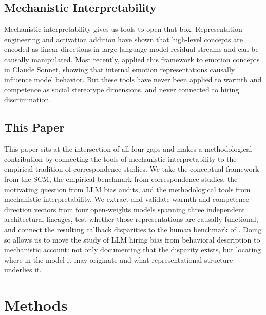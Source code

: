 \documentclass[twocolumn]{article}
\begin{document}
\subsection*{Mechanistic Interpretability}

Mechanistic interpretability gives us tools to open that box.
Representation engineering \citep{zou2023repeng} and activation addition
\citep{turner2023activation} have shown that high-level concepts are encoded as
linear directions in large language model residual streams and can be
causally manipulated.
Most recently, \citet{sofroniew2026emotion} applied this framework to emotion
concepts in Claude Sonnet, showing that internal emotion representations
causally influence model behavior.
But these tools have never been applied to warmth and competence as social
stereotype dimensions, and never connected to hiring discrimination.

\subsection*{This Paper}

This paper sits at the intersection of all four gaps and makes a
methodological contribution by connecting the tools of mechanistic
interpretability to the empirical tradition of correspondence studies.
We take the conceptual framework from the SCM, the empirical benchmark
from correspondence studies, the motivating question from LLM bias audits,
and the methodological tools from mechanistic interpretability.
We extract and validate warmth and competence direction vectors from four
open-weights models spanning three independent architectural lineages, test
whether those representations are causally functional, and connect the
resulting callback disparities to the human benchmark of
\citet{gallo2024warmth}.
Doing so allows us to move the study of LLM hiring bias from behavioral
description to mechanistic account: not only documenting that the disparity
exists, but locating where in the model it may originate and what
representational structure underlies it.

\section*{Methods}
\end{document}
